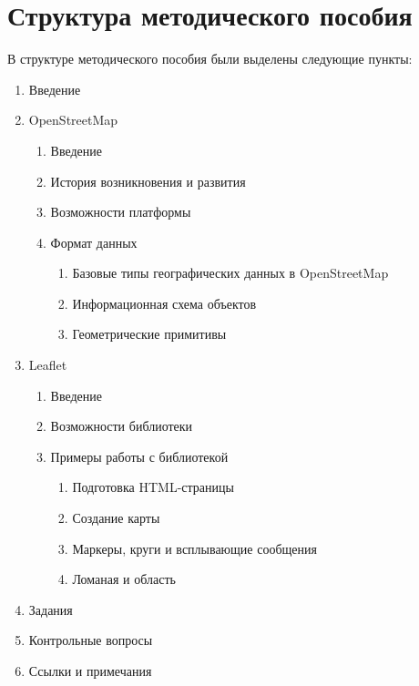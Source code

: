 \documentclass[a4paper, 14pt]{extreport}
\begin{document}
    \chapter{Структура методического пособия}
    В структуре методического пособия были выделены следующие пункты:
    \begin{enumerate}
        \item Введение
        \item OpenStreetMap
        \begin{enumerate}
            \item Введение
            \item История возникновения и развития
            \item Возможности платформы
            \item Формат данных
            \begin{enumerate}
                \item Базовые типы географических данных в OpenStreetMap
                \item Информационная схема объектов
                \item Геометрические примитивы
            \end{enumerate}
        \end{enumerate}
        \item Leaflet
        \begin{enumerate}
            \item Введение
            \item Возможности библиотеки
            \item Примеры работы с библиотекой
            \begin{enumerate}
                \item Подготовка HTML-страницы
                \item Создание карты
                \item Маркеры, круги и всплывающие сообщения
                \item Ломаная и область
            \end{enumerate}
        \end{enumerate}
        \item Задания
        \item Контрольные вопросы
        \item Ссылки и примечания
    \end{enumerate}

    \newpage
\end{document}

